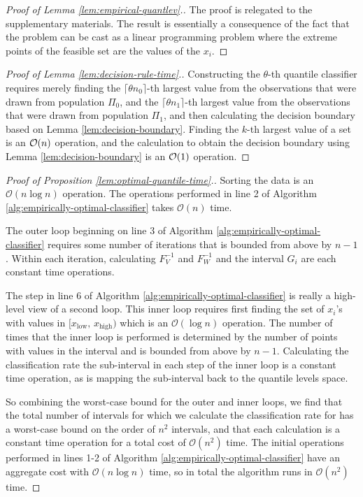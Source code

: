 \begin{proof}[Proof of Lemma \ref{lem:empirical-quantlev}.]
  The proof is relegated to the supplementary materials.  The result is
  essentially a consequence of the fact that the problem can be cast as a linear
  programming problem where the extreme points of the feasible set are the
  values of the $x_i$.
\end{proof}

\begin{proof}[Proof of Lemma \ref{lem:decision-rule-time}.]
  Constructing the $\theta$-th quantile classifier requires merely finding the
  $\lceil \theta n_0 \rceil$-th largest value from the observations that were
  drawn from population $\Pi_0$, and the $\lceil \theta n_1 \rceil$-th largest
  value from the observations that were drawn from population $\Pi_1$, and then
  calculating the decision boundary based on Lemma \ref{lem:decision-boundary}.
  Finding the $k$-th largest value of a set is an $\mathcal{O}(n)$ operation, and the
  calculation to obtain the decision boundary using Lemma
  \ref{lem:decision-boundary} is an $\mathcal{O}(1)$ operation.
\end{proof}

\begin{proof}[Proof of Proposition \ref{lem:optimal-quantile-time}.]
  Sorting the data is an $\mathcal{O}(n \log n)$ operation.  The operations
  performed in line 2 of Algorithm \ref{alg:empirically-optimal-classifier}
  takes $\mathcal{O}(n)$ time.

  The outer loop beginning on line 3 of Algorithm
  \ref{alg:empirically-optimal-classifier} requires some number of iterations
  that is bounded from above by $n - 1$.  Within each iteration, calculating
  $F_V^{-1}$ and $F_W^{-1}$ and the interval $G_i$ are each constant time
  operations.

  The step in line 6 of Algorithm \ref{alg:empirically-optimal-classifier} is
  really a high-level view of a second loop.  This inner loop requires first
  finding the set of $x_i$'s with values in
  $\big[x_{\scriptscriptstyle\text{low}},\,
  x_{\scriptscriptstyle\text{high}}\big)$ which is an $\mathcal{O}(\log n)$
  operation.  The number of times that the inner loop is performed is determined
  by the number of points with values in the interval and is bounded from above
  by $n - 1$.  Calculating the classification rate the sub-interval in each step
  of the inner loop is a constant time operation, as is mapping the sub-interval
  back to the quantile levels space.

  So combining the worst-case bound for the outer and inner loops, we find that
  the total number of intervals for which we calculate the classification rate
  for has a worst-case bound on the order of $n^2$ intervals, and that each
  calculation is a constant time operation for a total cost of
  $\mathcal{O}(n^2)$ time.  The initial operations performed in lines 1-2 of
  Algorithm \ref{alg:empirically-optimal-classifier} have an aggregate cost with
  $\mathcal{O}(n \log n)$ time, so in total the algorithm runs in
  $\mathcal{O}(n^2)$ time.
\end{proof}

